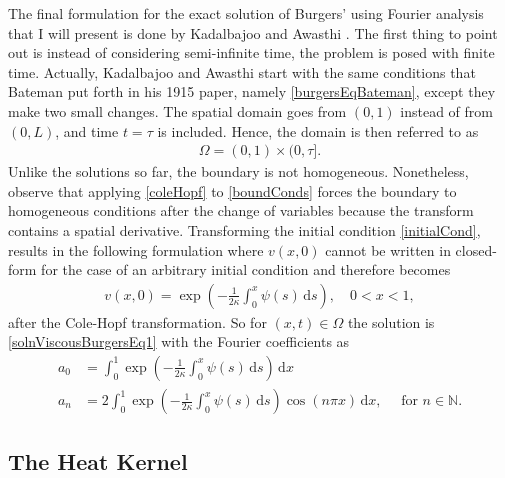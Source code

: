 \documentclass[undefended]{sfuthesis}
\begin{document}
The final formulation for the exact solution of Burgers' using Fourier analysis that I will present is done by Kadalbajoo and Awasthi \cite{burgerCrankNicolson}. The first thing to point out is instead of considering semi-infinite time, the problem is posed with finite time. Actually, Kadalbajoo and Awasthi start with the same conditions that Bateman \cite{bateman} put forth in his 1915 paper, namely \eqref{burgersEqBateman}, except they make two small changes. The spatial domain goes from $(0, 1)$ instead of from $(0, L)$, and time $t = \tau$ is included. Hence, the domain is then referred to as 
\begin{align}
	\Omega = (0, 1) \times (0, \tau]. \label{domain}
\end{align}
Unlike the solutions so far, the boundary is not homogeneous. Nonetheless, observe that applying \eqref{coleHopf} to \eqref{boundConds} forces the boundary to homogeneous conditions after the change of variables because the transform contains a spatial derivative. Transforming the initial condition \eqref{initialCond}, results in the following formulation where $v(x, 0)$ cannot be written in closed-form for the case of an arbitrary initial condition and therefore becomes
\begin{align}
v(x, 0) = \exp \left(- \frac{1}{2 \kappa} \int_{0}^{x} \psi(s) \,\mathrm{d} s \right), \quad 0 < x < 1, \label{initialCondColeHopf}
\end{align}
after the Cole-Hopf transformation. So for $(x, t) \in \Omega$ the solution is \eqref{solnViscousBurgersEq1} with the Fourier coefficients as
\begin{align*}
a_0 &= \int_{0}^{1} \exp \left(- \frac{1}{2 \kappa} \int_{0}^{x} \psi(s) \,\mathrm{d} s\right)\,\mathrm{d}x \\
a_n &= 2\int_{0}^{1} \exp \left(- \frac{1}{2 \kappa} \int_{0}^{x} \psi(s) \,\mathrm{d} s\right) \cos(n \pi x) \,\mathrm{d}x, \quad \text{ for } n \in \mathbb{N}.
\end{align*}

\subsection{The Heat Kernel}
\end{document}
